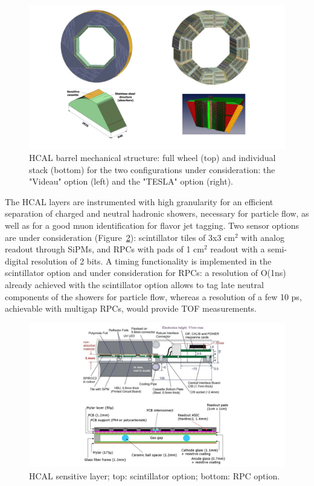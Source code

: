 \begin{figure}[t!]
\centering
\includegraphics[width=1.0\hsize]{Detector/fig/HCAL_structure.jpg}
\caption{HCAL barrel mechanical structure: full wheel (top) and individual stack (bottom) for the two configurations under consideration: the "Videau" option (left) and the "TESLA" option (right).}
\label{fig:det:HCAL}
\end{figure}

The HCAL layers are instrumented with high granularity for an efficient separation of charged and neutral hadronic showers, necessary for particle flow, as well as for a good muon identification for flavor jet tagging. Two sensor options are under consideration (Figure~\ref{fig:det:HCAL_readout}): scintillator tiles of 3x3 cm$^2$ with analog readout through SiPMs, and RPCs with pads of 1 cm$^2$ readout with a semi-digital resolution of 2 bits. A timing functionality is implemented in the scintillator option and under consideration for RPCs: a resolution of O(1ns) already achieved with the scintillator option allows to tag late neutral components of the showers for particle flow, whereas a resolution of a few 10 ps, achievable with multigap RPCs, would provide TOF measurements. 
\begin{figure}[t!]
\centering
\includegraphics[width=1.0\hsize]{Detector/fig/HCAL_readout.jpg}
\caption{HCAL sensitive layer; top: scintillator option; bottom: RPC option.}
\label{fig:det:HCAL_readout}
\end{figure}

